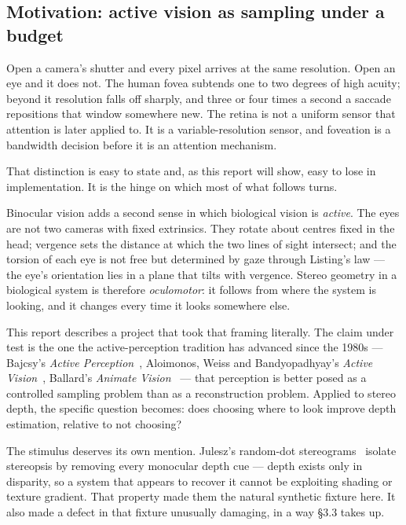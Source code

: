 \subsection{Motivation: active vision as sampling under a budget}

Open a camera's shutter and every pixel arrives at the same resolution. Open an
eye and it does not. The human fovea subtends one to two degrees of high acuity;
beyond it resolution falls off sharply, and three or four times a second a
saccade repositions that window somewhere new. The retina is not a uniform
sensor that attention is later applied to. It is a variable-resolution sensor,
and foveation is a bandwidth decision before it is an attention mechanism.

That distinction is easy to state and, as this report will show, easy to lose in
implementation. It is the hinge on which most of what follows turns.

Binocular vision adds a second sense in which biological vision is \emph{active}.
The eyes are not two cameras with fixed extrinsics. They rotate about centres
fixed in the head; vergence sets the distance at which the two lines of sight
intersect; and the torsion of each eye is not free but determined by gaze
through Listing's law --- the eye's orientation lies in a plane that tilts with
vergence. Stereo geometry in a biological system is therefore \emph{oculomotor}:
it follows from where the system is looking, and it changes every time it looks
somewhere else.

This report describes a project that took that framing literally. The claim
under test is the one the active-perception tradition has advanced since the
1980s --- Bajcsy's \emph{Active Perception}~\cite{bajcsy1988active}, Aloimonos,
Weiss and Bandyopadhyay's \emph{Active Vision}~\cite{aloimonos1988active},
Ballard's \emph{Animate Vision}~\cite{ballard1991animate} --- that perception is
better posed as a controlled sampling problem than as a reconstruction problem.
Applied to stereo depth, the specific question becomes: does choosing where to
look improve depth estimation, relative to not choosing?

The stimulus deserves its own mention. Julesz's random-dot
stereograms~\cite{julesz1960binocular} isolate stereopsis by removing every
monocular depth cue --- depth exists only in disparity, so a system that appears
to recover it cannot be exploiting shading or texture gradient. That property
made them the natural synthetic fixture here. It also made a defect in that
fixture unusually damaging, in a way \S3.3 takes up.

